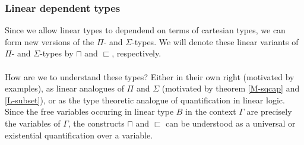 \subsubsection{Linear dependent types}
Since we allow linear types to dependend on terms of cartesian types, we can form new versions of the $\Pi$- and $\Sigma$-types. We will denote these linear variants of $\Pi$- and $\Sigma$-types by $\sqcap$ and $\sqsubset$, respectively.\\
\\
How are we to understand these types? Either in their own right (motivated by examples), as linear analogues of $\Pi$ and $\Sigma$ (motivated by theorem \ref{M-sqcap} and \ref{L-subset}), or as the type theoretic analogue of quantification in linear logic. Since the free variables occuring in linear type $B$ in the context $\Gamma$ are precisely the variables of $\Gamma$, the constructs $\sqcap$ and $\sqsubset$ can be understood as a universal or existential quantification over a variable.
